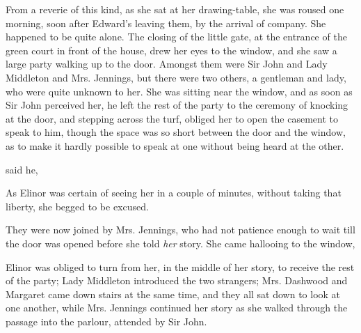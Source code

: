 From a reverie of this kind, as she sat at her drawing-table, she was roused one morning, soon after Edward's leaving them, by the arrival of company. She happened to be quite alone. The closing of the little gate, at the entrance of the green court in front of the house, drew her eyes to the window, and she saw a large party walking up to the door. Amongst them were Sir John and Lady Middleton and Mrs. Jennings, but there were two others, a gentleman and lady, who were quite unknown to her. She was sitting near the window, and as soon as Sir John perceived her, he left the rest of the party to the ceremony of knocking at the door, and stepping across the turf, obliged her to open the casement to speak to him, though the space was so short between the door and the window, as to make it hardly possible to speak at one without being heard at the other.

 said he, 



As Elinor was certain of seeing her in a couple of minutes, without taking that liberty, she begged to be excused.



They were now joined by Mrs. Jennings, who had not patience enough to wait till the door was opened before she told {\em her} story. She came hallooing to the window, 

Elinor was obliged to turn from her, in the middle of her story, to receive the rest of the party; Lady Middleton introduced the two strangers; Mrs. Dashwood and Margaret came down stairs at the same time, and they all sat down to look at one another, while Mrs. Jennings continued her story as she walked through the passage into the parlour, attended by Sir John.

